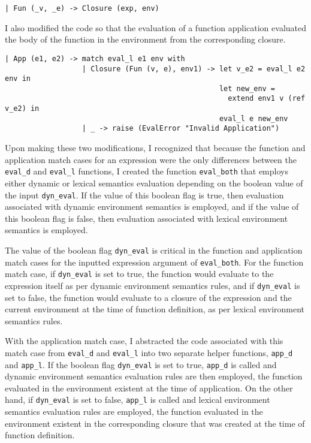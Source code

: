 \documentclass[12pt]{extarticle}
\begin{document}
\footnotesize
\begin{verbatim}
| Fun (_v, _e) -> Closure (exp, env)
\end{verbatim}

\vspace{0.3cm}
\normalsize
I also modified the code so that the evaluation of a function application evaluated the body of the function in the environment from the corresponding closure.

\footnotesize
\begin{verbatim}
| App (e1, e2) -> match eval_l e1 env with
                  | Closure (Fun (v, e), env1) -> let v_e2 = eval_l e2 env in
                                                  let new_env = 
                                                    extend env1 v (ref v_e2) in
                                                  eval_l e new_env
                  | _ -> raise (EvalError "Invalid Application")
\end{verbatim}

\vspace{0.3cm}
\normalsize
Upon making these two modifications, I recognized that because the function and application match cases for an expression were the only differences between the \texttt{eval_d} and \texttt{eval_l} functions, I created the function \texttt{eval_both} that employs either dynamic or lexical semantics evaluation depending on the boolean value of the input \texttt{dyn_eval}. If the value of this boolean flag is true, then evaluation associated with dynamic environment semantics is employed, and if the value of this boolean flag is false, then evaluation associated with lexical environment semantics is employed.

\vspace{0.3cm}
The value of the boolean flag \texttt{dyn_eval} is critical in the function and application match cases for the inputted expression argument of \texttt{eval_both}. For the function match case, if \texttt{dyn_eval} is set to true, the function would evaluate to the expression itself as per dynamic environment semantics rules, and if \texttt{dyn_eval} is set to false, the function would evaluate to a closure of the expression and the current environment at the time of function definition, as per lexical environment semantics rules.

\vspace{0.3cm}
With the application match case, I abstracted the code associated with this match case from \texttt{eval_d} and \texttt{eval_l} into two separate helper functions, \texttt{app_d} and \texttt{app_l}. If the boolean flag \texttt{dyn_eval} is set to true, \texttt{app_d} is called and dynamic environment semantics evaluation rules are then employed, the function evaluated in the environment existent at the time of application. On the other hand, if \texttt{dyn_eval} is set to false, \texttt{app_l} is called and lexical environment semantics evaluation rules are employed, the function evaluated in the environment existent in the corresponding closure that was created at the time of function definition.
\end{document}
